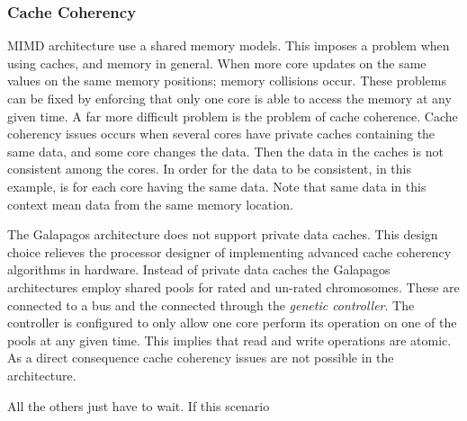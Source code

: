 




\subsubsection{Cache Coherency}
MIMD architecture use a shared memory models. This imposes a problem when using caches, and memory in general. When more core updates on the same values on the same memory positions; memory collisions occur. These problems can be fixed by enforcing that only one core is able to access the memory at any given time. A far more difficult problem is the problem of cache coherence. Cache coherency issues occurs when several cores have private caches containing the same data, and some core changes the data. Then the data in the caches is not consistent among the cores. In order for the data to be consistent, in this example, is for each core having the same data. Note that same data in this context mean data from the same memory location. 

The Galapagos architecture does not support private data caches. This design choice relieves the processor designer of implementing advanced cache coherency algorithms in hardware. Instead of private data caches the Galapagos architectures employ shared pools for rated and un-rated chromosomes. These are connected to a bus and the connected through the \emph{genetic controller}. The controller is configured to only allow one core perform its operation on one of the pools at any given time. This implies that read and write operations are atomic. As a direct consequence cache coherency issues are not possible in the architecture. 






All the others just have to wait. If this scenario 









\section{}
